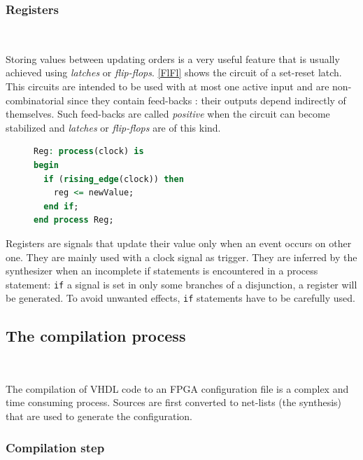 \documentclass[10pt,a4paper]{article}
\newcommand{\code}{\texttt}
\renewcommand{\indent}{~\\\vspace{-.8cm}}
\begin{document}
\subsubsection{Registers}\indent


Storing values between updating orders is a very useful feature that is usually achieved using \textit{latches} or \textit{flip-flops}. \autoref{FlFl} shows the circuit of a set-reset latch. This circuits are intended to be used with at most one active input and are non-combinatorial since they contain feed-backs : their outputs depend indirectly of themselves. Such feed-backs are called \textit{positive} when the circuit can become stabilized and \textit{latches} or \textit{flip-flops} are of this kind. \\


\begin{figure}
	\vspace{-15pt}
\begin{lstlisting}[language=VHDL, frame=single, title=Register generation]
Reg: process(clock) is
begin
  if (rising_edge(clock)) then
    reg <= newValue;
  end if;
end process Reg;
\end{lstlisting}
\end{figure}

Registers are signals that update their value only when an event occurs on other one. They are mainly used with a clock signal as trigger. They are inferred by the synthesizer when an incomplete if statements is encountered in a process statement: \code{if} a signal is set in only some branches of a disjunction, a register will be generated. To avoid unwanted effects, \code{if} statements have to be carefully used.





\subsection{The compilation process} \indent

The compilation of VHDL code to an FPGA configuration file is a complex and time consuming process. Sources are first converted to net-lists (the synthesis) that are used to generate the configuration. 

\subsubsection{Compilation step} \indent
\end{document}
